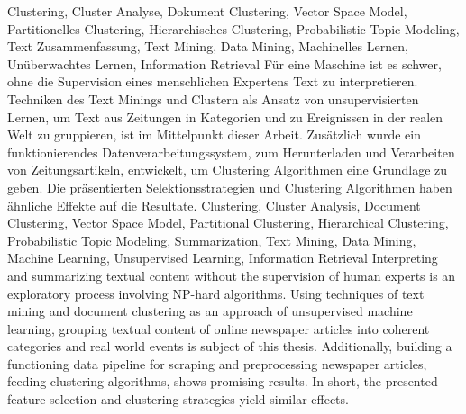 \HAWAbstractPage
  {
    Clustering, Cluster Analyse, 
    Dokument Clustering, Vector Space Model,
    Partitionelles Clustering,
    Hierarchisches Clustering,
    Probabilistic Topic Modeling, 
    Text Zusammenfassung,
    Text Mining, Data Mining,
    Machinelles Lernen, Unüberwachtes Lernen, 
    Information Retrieval
  }
  { 
    Für eine Maschine ist es schwer, ohne die Supervision eines menschlichen Expertens Text zu interpretieren. Techniken des Text Minings und Clustern als Ansatz von unsupervisierten Lernen, um Text aus Zeitungen in Kategorien und zu Ereignissen in der realen Welt zu gruppieren, ist im Mittelpunkt dieser Arbeit. Zusätzlich wurde ein funktionierendes Datenverarbeitungssystem, zum Herunterladen und Verarbeiten von Zeitungsartikeln, entwickelt, um Clustering Algorithmen eine Grundlage zu geben. Die präsentierten Selektionsstrategien und Clustering Algorithmen haben ähnliche Effekte auf die Resultate.
  }
  { 
    Clustering, Cluster Analysis, 
    Document Clustering, Vector Space Model,
    Partitional Clustering,
    Hierarchical Clustering,
    Probabilistic Topic Modeling,
    Summarization,
    Text Mining, Data Mining,
    Machine Learning, Unsupervised Learning, 
    Information Retrieval
  }
  {
    Interpreting and summarizing textual content without the supervision of human experts is an exploratory process involving NP-hard algorithms. Using techniques of text mining and document clustering as an approach of unsupervised machine learning, grouping textual content of online newspaper articles into coherent categories and real world events is subject of this thesis. Additionally, building a functioning data pipeline for scraping and preprocessing newspaper articles, feeding clustering algorithms, shows promising results. In short, the presented feature selection and clustering strategies yield similar effects.
  }



